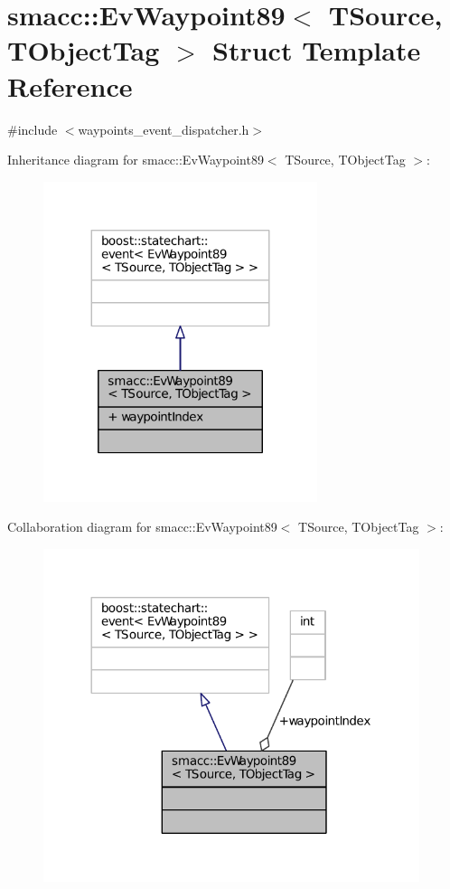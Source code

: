 \hypertarget{structsmacc_1_1EvWaypoint89}{}\section{smacc\+:\+:Ev\+Waypoint89$<$ T\+Source, T\+Object\+Tag $>$ Struct Template Reference}
\label{structsmacc_1_1EvWaypoint89}


{\ttfamily \#include $<$waypoints\+\_\+event\+\_\+dispatcher.\+h$>$}



Inheritance diagram for smacc\+:\+:Ev\+Waypoint89$<$ T\+Source, T\+Object\+Tag $>$\+:
\nopagebreak
\begin{figure}[H]
\begin{center}
\leavevmode
\includegraphics[width=227pt]{structsmacc_1_1EvWaypoint89__inherit__graph}
\end{center}
\end{figure}


Collaboration diagram for smacc\+:\+:Ev\+Waypoint89$<$ T\+Source, T\+Object\+Tag $>$\+:
\nopagebreak
\begin{figure}[H]
\begin{center}
\leavevmode
\includegraphics[width=312pt]{structsmacc_1_1EvWaypoint89__coll__graph}
\end{center}
\end{figure}
